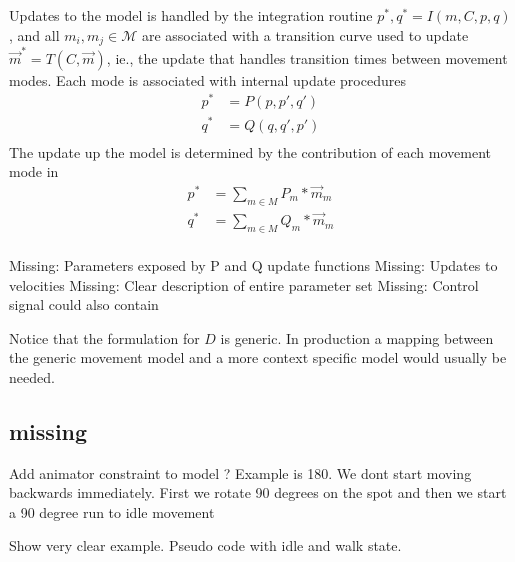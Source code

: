 Updates to the model is handled by the integration routine $p^*,q^*=I(m,C,p,q)$, and all $m_i,m_j\in\mathcal{M}$ are associated with a transition curve used to update $\vec{m}^*=T(C,\vec{m})$, ie., the update that handles transition times between movement modes. 
Each mode is associated with internal update procedures
\begin{equation}
\begin{split}
    p^*&=P(p,p',q')\\
    q^*&=Q(q,q',p')\\
\end{split}
\end{equation}
The update up the model is determined by the contribution of each movement mode in 
\begin{equation}
\begin{split}
    p^*&=\sum_{m\in{M}}{P_m*\vec{m}_m}\\
    q^*&=\sum_{m\in{M}}{Q_m*\vec{m}_m}\\
\end{split}
\end{equation}

Missing: Parameters exposed by P and Q update functions
Missing: Updates to velocities
Missing: Clear description of entire parameter set
Missing: Control signal could also contain

Notice that the formulation for $D$ is generic. In production a mapping between the generic movement model and a more context specific model would usually be needed. 

\subsection{missing}
Add animator constraint to model ? Example is 180. We dont start moving backwards immediately. First we rotate 90 degrees on the spot and then we start a 90 degree run to idle movement

Show very clear example. Pseudo code with idle and walk state. 